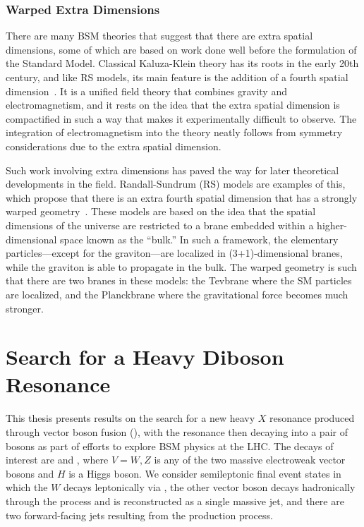 \subsubsection{Warped Extra Dimensions}

There are many BSM theories that suggest that there are extra spatial dimensions, some of which are based on work done well before the formulation of the Standard Model.
Classical Kaluza-Klein theory has its roots in the early 20th century, and like RS models, its main feature is the addition of a fourth spatial dimension~\cite{1921spaw966K}.
It is a unified field theory that combines gravity and electromagnetism, and it rests on the idea that the extra spatial dimension is compactified in such a way that makes it experimentally difficult to observe.
The integration of electromagnetism into the theory neatly follows from symmetry considerations due to the extra spatial dimension.

Such work involving extra dimensions has paved the way for later theoretical developments in the field.
Randall-Sundrum (RS) models are examples of this, which propose that there is an extra fourth spatial dimension that has a strongly warped geometry~\cite{PhysRevLett.83.4690}.
These models are based on the idea that the spatial dimensions of the universe are restricted to a brane embedded within a higher-dimensional space known as the ``bulk.''
In such a framework, the elementary particles---except for the graviton---are localized in (3+1)-dimensional branes, while the graviton is able to propagate in the bulk.
The warped geometry is such that there are two branes in these models: the Tevbrane where the SM particles are localized, and the Planckbrane where the gravitational force becomes much stronger.

\section{Search for a Heavy Diboson Resonance}
\label{sec:VBF}

This thesis presents results on the search for a new heavy $X$ resonance produced through vector boson fusion (\VBF), with the resonance then decaying into a pair of bosons as part of efforts to explore BSM physics at the LHC.
The decays of interest are \XtoWV and \XtoWH, where $V=W,Z$ is any of the two massive electroweak vector bosons and $H$ is a Higgs boson.
We consider semileptonic final event states in which the $W$ decays leptonically via \Wtolnu, the other vector boson decays hadronically through the process \Vtoqqbarpr and is reconstructed as a single massive jet, and there are two forward-facing jets resulting from the \VBF production process.

